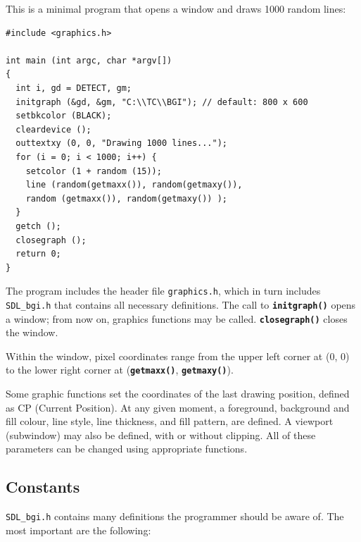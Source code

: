 \documentclass[a4paper,12pt]{article}
\newcommand{\func}[1]{\textbf{\texttt{#1}}}  %
\newcommand{\F}[1]{\texttt{#1}}     %
\begin{document}
This is a minimal program that opens a  window and draws 1000 random
lines:

\begin{small}
\begin{spacing}{0.9}
\begin{verbatim}
#include <graphics.h>

int main (int argc, char *argv[])
{
  int i, gd = DETECT, gm;
  initgraph (&gd, &gm, "C:\\TC\\BGI"); // default: 800 x 600
  setbkcolor (BLACK);
  cleardevice ();
  outtextxy (0, 0, "Drawing 1000 lines...");
  for (i = 0; i < 1000; i++) {
    setcolor (1 + random (15));
    line (random(getmaxx()), random(getmaxy()),
    random (getmaxx()), random(getmaxy()) );
  }
  getch ();
  closegraph ();
  return 0;
}
\end{verbatim}
\end{spacing}
\end{small}

The program includes the header file \F{graphics.h}, which in turn
includes \F{SDL\_bgi.h} that contains all necessary definitions. The
call to \func{initgraph()} opens a window; from now on, graphics
functions may be called. \func{closegraph()} closes the window.

Within the window, pixel coordinates range from the upper left corner
at (0, 0) to the lower right corner at (\func{get\-maxx()},
\func{getmaxy()}).

Some graphic functions set the coordinates of the last drawing
position, defined as CP (Current Position). At any given moment, a
foreground, background and fill colour, line style, line thickness,
and fill pattern, are defined. A viewport (subwindow) may also be
defined, with or without clipping. All of these parameters can be
changed using appropriate functions.


\subsection{Constants}

\F{SDL\_bgi.h} contains many definitions the programmer should be
aware of. The most important are the following:
\end{document}
